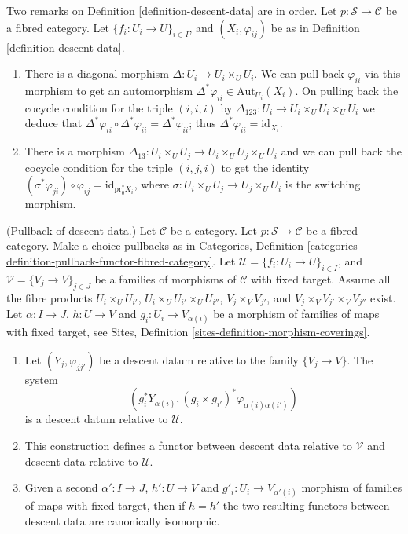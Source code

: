 \begin{remarks}
\label{remarks-definition-descent-datum}
Two remarks on Definition \ref{definition-descent-data} are in order.
Let $p : \mathcal{S} \to \mathcal{C}$ be a fibred category.
Let $\{f_i : U_i \to U\}_{i \in I}$, and $(X_i, \varphi_{ij})$
be as in Definition \ref{definition-descent-data}.
\begin{enumerate}
\item There is a diagonal morphism $\Delta : U_i \to U_i \times_U U_i$.
We can pull back $\varphi_{ii}$ via this morphism to get an automorphism
$\Delta^\ast \varphi_{ii} \in \text{Aut}_{U_i}(X_i)$.
On pulling back the cocycle condition for the triple $(i, i, i)$
by $\Delta_{123} : U_i \to U_i \times_U U_i \times_U U_i$ we deduce that
$\Delta^\ast \varphi_{ii} \circ \Delta^\ast \varphi_{ii} =
\Delta^\ast \varphi_{ii}$; thus $\Delta^\ast \varphi_{ii} =
\text{id}_{X_i}$.
\item There is a morphism
$\Delta_{13}: U_i \times_U U_j \to U_i \times_U U_j \times_U U_i$
and we can pull back the
cocycle condition for the triple $(i, j, i)$ to get the
identity $(\sigma^\ast \varphi_{ji}) \circ \varphi_{ij} =
\text{id}_{\text{pr}_0^\ast X_i}$, where
$\sigma : U_i \times_U U_j \to U_j \times_U U_i$ is the switching morphism.
\end{enumerate}
\end{remarks}

\begin{lemma}
\label{lemma-pullback}
(Pullback of descent data.)
Let $\mathcal{C}$ be a category.
Let $p : \mathcal{S} \to \mathcal{C}$ be a fibred category.
Make a choice pullbacks as in Categories,
Definition \ref{categories-definition-pullback-functor-fibred-category}.
Let $\mathcal{U} = \{f_i : U_i \to U\}_{i \in I}$, and
$\mathcal{V} = \{V_j \to V\}_{j \in J}$
be a families of morphisms of $\mathcal{C}$ with fixed target.
Assume all the fibre products
$U_i \times_U U_{i'}$, $U_i \times_U U_{i'} \times_U U_{i''}$,
$V_j \times_V V_{j'}$, and $V_j \times_V V_{j'} \times_V V_{j''}$ exist.
Let $\alpha : I \to J$, $h : U \to V$ and
$g_i : U_i \to V_{\alpha(i)}$ be a morphism of families
of maps with fixed target, see
Sites, Definition \ref{sites-definition-morphism-coverings}.
\begin{enumerate}
\item Let $(Y_j, \varphi_{jj'})$ be a descent datum relative to the
family $\{V_j \to V\}$. The system
$$
\left(
g_i^*Y_{\alpha(i)},
(g_i \times g_{i'})^*\varphi_{\alpha(i)\alpha(i')}
\right)
$$
is a descent datum relative to $\mathcal{U}$.
\item This construction defines a functor between descent data relative
to $\mathcal{V}$ and descent data relative to $\mathcal{U}$.
\item Given a second $\alpha' : I \to J$, $h' : U \to V$ and
$g'_i : U_i \to V_{\alpha'(i)}$ morphism of families
of maps with fixed target, then if $h = h'$ the two resulting functors
between descent data are canonically isomorphic.
\end{enumerate}
\end{lemma}

